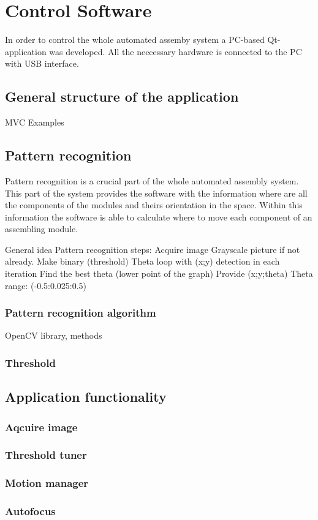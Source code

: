 \chapter{Control Software}

In order to control the whole automated assemby system a PC-based Qt-application was developed. All the neccessary hardware is connected to the PC with USB interface.

\section{General structure of the application}

MVC
Examples

\section{Pattern recognition}

Pattern recognition is a crucial part of the whole automated assembly system. This part of the system provides the software with the information where are all the components of the modules and theirs orientation in the space. Within this information the software is able to calculate where to move each component of an assembling module.



General idea
Pattern recognition steps:
Acquire image
Grayscale picture if not already.
Make binary (threshold)
Theta loop with (x;y) detection in each iteration
Find the best theta (lower point of the graph)
Provide (x;y;theta)
Theta range:
(-0.5:0.025:0.5)


\subsection{Pattern recognition algorithm}

OpenCV library, methods

\subsection{Threshold}



\section{Application functionality}

\subsection{Aqcuire image}

\subsection{Threshold tuner}

\subsection{Motion manager}

\subsection{Autofocus}






